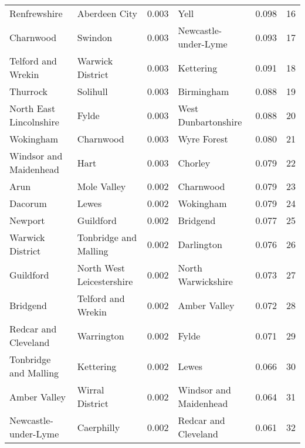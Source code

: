 \begin{tabular}{llrlrr}
Renfrewshire              &              Aberdeen City &  0.003 &                       Yell &   0.098 &    16 \\
Charnwood                 &                    Swindon &  0.003 &       Newcastle-under-Lyme &   0.093 &    17 \\
Telford and Wrekin        &           Warwick District &  0.003 &                  Kettering &   0.091 &    18 \\
Thurrock                  &                   Solihull &  0.003 &                 Birmingham &   0.088 &    19 \\
North East Lincolnshire   &                      Fylde &  0.003 &        West Dunbartonshire &   0.088 &    20 \\
Wokingham                 &                  Charnwood &  0.003 &                Wyre Forest &   0.080 &    21 \\
Windsor and Maidenhead    &                       Hart &  0.003 &                    Chorley &   0.079 &    22 \\
Arun                      &                Mole Valley &  0.002 &                  Charnwood &   0.079 &    23 \\
Dacorum                   &                      Lewes &  0.002 &                  Wokingham &   0.079 &    24 \\
Newport                   &                  Guildford &  0.002 &                   Bridgend &   0.077 &    25 \\
Warwick District          &      Tonbridge and Malling &  0.002 &                 Darlington &   0.076 &    26 \\
Guildford                 &  North West Leicestershire &  0.002 &         North Warwickshire &   0.073 &    27 \\
Bridgend                  &         Telford and Wrekin &  0.002 &               Amber Valley &   0.072 &    28 \\
Redcar and Cleveland      &                 Warrington &  0.002 &                      Fylde &   0.071 &    29 \\
Tonbridge and Malling     &                  Kettering &  0.002 &                      Lewes &   0.066 &    30 \\
Amber Valley              &            Wirral District &  0.002 &     Windsor and Maidenhead &   0.064 &    31 \\
Newcastle-under-Lyme      &                 Caerphilly &  0.002 &       Redcar and Cleveland &   0.061 &    32 \\

\end{tabular}
